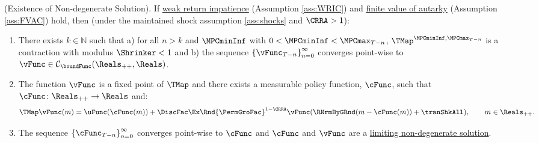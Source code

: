 \documentclass[\econtexRoot/BufferStockTheory]{subfiles}
\begin{document}
\hypertarget{Sufficient-Conditions-For-non-degenerate-Solution}{}
\begin{theorem}(Existence of Non-degenerate Solution).
\label{thm:convgtobellman}
If \hyperlink{WRIC}{weak return impatience} (Assumption \ref{ass:WRIC}) and \hyperlink{FVAC}{finite value of autarky} (Assumption \ref{ass:FVAC}) hold, then (under the maintained shock assumption \ref{ass:shocks} and $\CRRA>1$):
%
\begin{enumerate}[label=(\roman*)]
\item There exists $k\in \mathbb{N}$ such that a) for all $n>k$ and $\MPCminInf$ with $0<\MPCminInf<\MPCmax_{T-n}$, $\TMap^{\MPCminInf, \MPCmax_{T-n}}$ is a contraction with modulus $\Shrinker<1$ and b) the sequence $\left\{\vFunc_{T-n}\right\}_{n=0}^{\infty}$ converges point-wise to $\vFunc \in \mathcal{C}_{\boundFunc}(\Reals_{++},\Reals)$.
\item The function $\vFunc$ is a fixed point of $\TMap$ and there exists a measurable policy function, $\cFunc$, such that $\cFunc\colon \Reals_{++}\rightarrow \Reals$ and:
\begin{equation}\label{eq:stationarybellman}
\TMap\vFunc(m) =  \uFunc(\cFunc(m)) + \DiscFac\Ex \Rnd{\PermGroFac}^{1-\CRRA}\vFunc(\RNrmByGRnd(m-\cFunc(m)) + \tranShkAll) , \qquad m\in \Reals_{++}. 
\end{equation}
\item  The sequence $\left\{\cFunc_{T-n}\right\}_{n=0}^{\infty}$ converges point-wise to $\cFunc$ and $\cFunc$ and $\vFunc$ are a \hyperref[def:nondegeneracy]{limiting non-degenerate solution}.
\end{enumerate}
\end{theorem}
\end{document}
